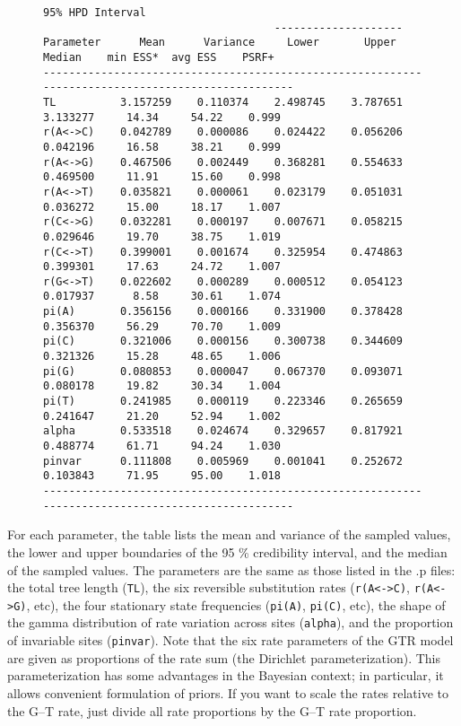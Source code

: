 \documentclass[12pt]{book}
\begin{document}
\begin{figure}[h]
\centering
\begin{BVerbatim}[fontsize=\scriptsize]
                                    95%
                                    --------------------
Parameter      Mean      Variance     Lower       Upper       Median    min ESS*  avg ESS    PSRF+ 
--------------------------------------------------------------------------------------------------
TL          3.157259    0.110374    2.498745    3.787651    3.133277     14.34     54.22    0.999
r(A<->C)    0.042789    0.000086    0.024422    0.056206    0.042196     16.58     38.21    0.999
r(A<->G)    0.467506    0.002449    0.368281    0.554633    0.469500     11.91     15.60    0.998
r(A<->T)    0.035821    0.000061    0.023179    0.051031    0.036272     15.00     18.17    1.007
r(C<->G)    0.032281    0.000197    0.007671    0.058215    0.029646     19.70     38.75    1.019
r(C<->T)    0.399001    0.001674    0.325954    0.474863    0.399301     17.63     24.72    1.007
r(G<->T)    0.022602    0.000289    0.000512    0.054123    0.017937      8.58     30.61    1.074
pi(A)       0.356156    0.000166    0.331900    0.378428    0.356370     56.29     70.70    1.009
pi(C)       0.321006    0.000156    0.300738    0.344609    0.321326     15.28     48.65    1.006
pi(G)       0.080853    0.000047    0.067370    0.093071    0.080178     19.82     30.34    1.004
pi(T)       0.241985    0.000119    0.223346    0.265659    0.241647     21.20     52.94    1.002
alpha       0.533518    0.024674    0.329657    0.817921    0.488774     61.71     94.24    1.030
pinvar      0.111808    0.005969    0.001041    0.252672    0.103843     71.95     95.00    1.018
--------------------------------------------------------------------------------------------------
\end{BVerbatim}
\end{figure}

For each parameter, the table lists the mean and variance of the sampled values, the lower and
upper boundaries of the 95 \% credibility interval, and the median of the sampled values. The
parameters are the same as those listed in the .p files: the total tree length (\texttt{TL}), the
six reversible substitution rates (\texttt{r(A<->C)}, \texttt{r(A<->G)}, etc), the four stationary
state frequencies (\texttt{pi(A)}, \texttt{pi(C)}, etc), the shape of the gamma distribution of
rate variation across sites (\texttt{alpha}), and the proportion of invariable sites
(\texttt{pinvar}). Note that the six rate parameters of the GTR model are given as proportions of
the rate sum (the Dirichlet parameterization). This parameterization has some advantages in the
Bayesian context; in particular, it allows convenient formulation of priors. If you want to scale
the rates relative to the G--T rate, just divide all rate proportions by the G--T rate proportion.
\end{document}
